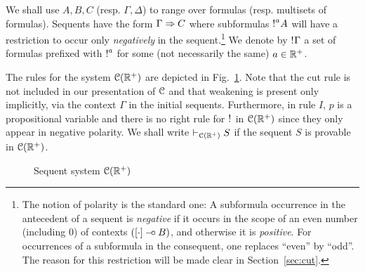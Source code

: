 
We shall use $A,B,C$ (resp. $\Gamma,\Delta$) to range over formulas (resp. multisets of formulas).  
Sequents have the form $\Gamma\Rightarrow C$ where subformulas $\hbox{$\mathop{!}^{a}$}A$ will have a restriction to occur only {\em negatively} in the sequent.\footnote{The notion of polarity  is the standard one: A subformula occurrence in the antecedent of a sequent is {\em negative} if it occurs in the scope of an even number (including $0$) of contexts $([\cdot]\mathbin{-\hspace{-0.70mm}\circ} B)$, and otherwise it is {\em positive}. For occurrences of a subformula in the consequent, one replaces ``even'' by ``odd''. The reason for this restriction will be made clear in Section~\ref{sec:cut}.}
%
We denote by $\hbox{$\mathop{!}^{}$}\Gamma$ a set of formulas  prefixed with $\hbox{$\mathop{!}^{a}$}$ for some (not necessarily the same) $a\in\mathbb{R}^+$. 

The rules for the system $\mathcal{C}(\mathbb{R}^+)$ are depicted in Fig.~\ref{fig:ll}. Note that the cut rule is not included in our presentation of $\mathcal{C}$ and that weakening is present only implicitly, via the context $\Gamma$ in the initial sequents. Furthermore, in rule $I$, $p$ is a propositional variable and there is no right rule for $\hbox{$\mathop{!}^{}$}$ in $\mathcal{C}(\mathbb{R}^+)$ since they only appear in negative polarity.
We shall write $\vdash_{\mathcal{C}(\mathbb{R}^+)} S$ if the sequent $S$ is provable in $\mathcal{C}(\mathbb{R}^+)$.

\begin{figure}[t]
\caption{Sequent system $\mathcal{C}(\mathbb{R}^+)$}
\label{fig:ll}
\end{figure}

